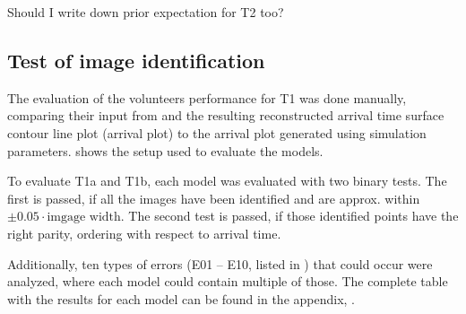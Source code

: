 \todo{!} Should I write down prior expectation for T2 too?


\subsection{Test of image identification} \label{sec:tests.t1}

The evaluation of the volunteers performance for T1 was done manually, comparing their input from \spl and the resulting reconstructed arrival time surface contour line plot (arrival plot) to the arrival plot generated using simulation parameters.
 shows the setup used to evaluate the models.


To evaluate T1a and T1b, each model was evaluated with two binary tests.
The first is passed, if all the images have been identified and are approx. within $\pm0.05\cdot\text{imgage width}$.
The second test is passed, if those identified points have the right parity, ordering with respect to arrival time.

Additionally, ten types of errors (E01 -- E10, listed in ) that could occur were analyzed, where each model could contain multiple of those.
The complete table with the results for each model can be found in the appendix, .




